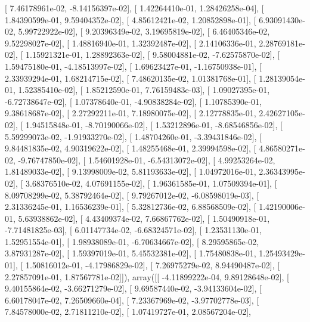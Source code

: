 \documentclass{article}
\begin{document}
       [  7.46178961e-02,  -8.14156397e-02],
       [  1.42264410e-01,   1.28426258e-04],
       [  1.84390599e-01,   9.59404352e-02],
       [  4.85612421e-02,   1.20852898e-01],
       [  6.93091430e-02,   5.99722922e-02],
       [  9.20396349e-02,   3.19695819e-02],
       [  6.46405346e-02,   9.52298027e-02],
       [  1.48816940e-01,   1.32392487e-02],
       [  2.14106336e-01,   2.28769181e-02],
       [  1.15921321e-01,   1.28892363e-02],
       [  9.58004881e-02,  -7.62575870e-02],
       [  1.59475180e-01,  -4.18513997e-02],
       [  1.69623427e-01,  -1.16750938e-01],
       [  2.33939294e-01,   1.68214715e-02],
       [  7.48620135e-02,   1.01381768e-01],
       [  1.28139054e-01,   1.52385410e-02],
       [  1.85212590e-01,   7.76159483e-03],
       [  1.09027395e-01,  -6.72738647e-02],
       [  1.07378640e-01,  -4.90838284e-02],
       [  1.10785390e-01,   9.38618687e-02],
       [  2.27292211e-01,   7.18980075e-02],
       [  2.12778835e-01,   2.42627105e-02],
       [  1.94515848e-01,  -8.70190066e-02],
       [  1.53212896e-01,  -8.68546856e-02],
       [  5.59299073e-02,  -1.91933270e-02],
       [  1.48704260e-01,  -3.39431846e-02],
       [  9.84481835e-02,   4.90319622e-02],
       [  1.48255468e-01,   2.39994598e-02],
       [  4.86580271e-02,  -9.76747850e-02],
       [  1.54601928e-01,  -6.54313072e-02],
       [  4.99253264e-02,   1.81489033e-02],
       [  9.13998009e-02,   5.81193633e-02],
       [  1.04972016e-01,   2.36343995e-02],
       [  3.68376510e-02,   4.07691155e-02],
       [  1.96361585e-01,   1.07509394e-01],
       [  8.09708299e-02,   5.38792464e-02],
       [  9.79267012e-02,  -6.08598019e-03],
       [  2.31336245e-01,   1.16536239e-01],
       [  5.32812736e-02,   6.88568509e-02],
       [  1.42190006e-01,   5.63938862e-02],
       [  4.43409374e-02,   7.66867762e-02],
       [  1.50490918e-01,  -7.71481825e-03],
       [  6.01147734e-02,  -6.68324571e-02],
       [  1.23531130e-01,   1.52951554e-01],
       [  1.98938089e-01,  -6.70634667e-02],
       [  8.29595865e-02,   3.87931287e-02],
       [  1.59397019e-01,   5.45532381e-02],
       [  1.75480838e-01,   1.25493429e-01],
       [  1.50816012e-01,  -4.17986829e-02],
       [  7.26975279e-02,   8.94490487e-02],
       [  2.27857091e-01,   1.87567781e-02]]), array([[ -4.11899222e-04,   9.89128648e-02],
       [  9.40155864e-02,  -3.66271279e-02],
       [  9.69587440e-02,  -3.94133604e-02],
       [  6.60178047e-02,   7.26509660e-04],
       [  7.23367969e-02,  -3.97702778e-03],
       [  7.84578000e-02,   2.71811210e-02],
       [  1.07419727e-01,   2.08567204e-02],
\end{document}
